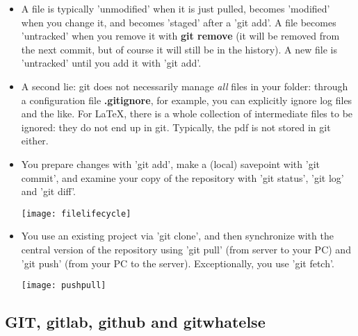 \documentclass{ximera}
\begin{document}
\begin{itemize}
\item A file is typically 'unmodified' when it is just pulled, becomes 'modified' when you change it, and becomes 'staged' after a 'git add'. A file becomes 'untracked' when you remove it with \textbf{git remove} (it will be removed from the next commit, but of course it will still be in the history). A new file is 'untracked' until you add it with 'git add'. 

\item A second lie: git does not necessarily manage \textit{all} files in your folder: through a configuration file \textbf{.gitignore}, for example, you can explicitly ignore log files and the like. For LaTeX, there is a whole collection of intermediate files to be ignored: they do not end up in git. Typically, the pdf is not stored in git either.

\item You prepare changes with 'git add', make a (local) savepoint with 'git commit', and examine your copy of the repository with 'git status', 'git log' and 'git diff'.
\begin{image}[0.6\textwidth]
\texttt{[image: filelifecycle]}
\end{image}

\item You use an existing project via 'git clone', and then synchronize with the central version of the repository using 'git pull' (from server to your PC) and 'git push' (from your PC to the server). Exceptionally, you use 'git fetch'.

\begin{image}[0.6\textwidth]
\texttt{[image: pushpull]}
\end{image}


\end{itemize}

\subsection{GIT, gitlab, github and gitwhatelse}
\end{document}
